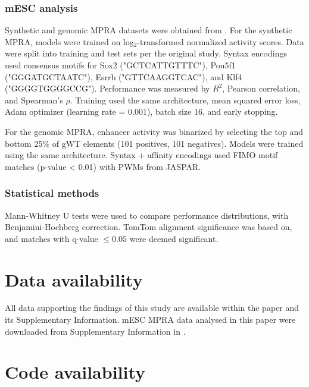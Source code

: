 \subsubsection{mESC analysis}

Synthetic and genomic MPRA datasets were obtained from \cite{King2020-hk}. For the synthetic MPRA, models were trained on log$_2$-transformed normalized activity scores. Data were split into training and test sets per the original study. Syntax encodings used consensus motifs for Sox2 ("GCTCATTGTTTC"), Pou5f1 ("GGGATGCTAATC"), Esrrb ("GTTCAAGGTCAC"), and Klf4 ("GGGGTGGGGCCG"). Performance was measured by \(R^2\), Pearson correlation, and Spearman's \(\rho\). Training used the same architecture, mean squared error loss, Adam optimizer (learning rate = 0.001), batch size 16, and early stopping.

For the genomic MPRA, enhancer activity was binarized by selecting the top and bottom 25\% of gWT elements (101 positives, 101 negatives). Models were trained using the same architecture. Syntax + affinity encodings used FIMO motif matches (p-value \textless{} 0.01) with PWMs from JASPAR\cite{Castro-Mondragon2022-kx}.

\subsubsection{Statistical methods}

Mann-Whitney U tests\cite{Mann1947-dw} were used to compare performance distributions, with Benjamini-Hochberg correction\cite{Benjamini1995-da}. TomTom alignment significance was based on\cite{Gupta2007-zw}, and matches with q-value \(\leq 0.05\) were deemed significant.

\section{Data availability}

All data supporting the findings of this study are available within the paper and its Supplementary Information. mESC MPRA data analysed in this paper were downloaded from Supplementary Information in \cite{King2020-hk}.

\section{Code availability}


